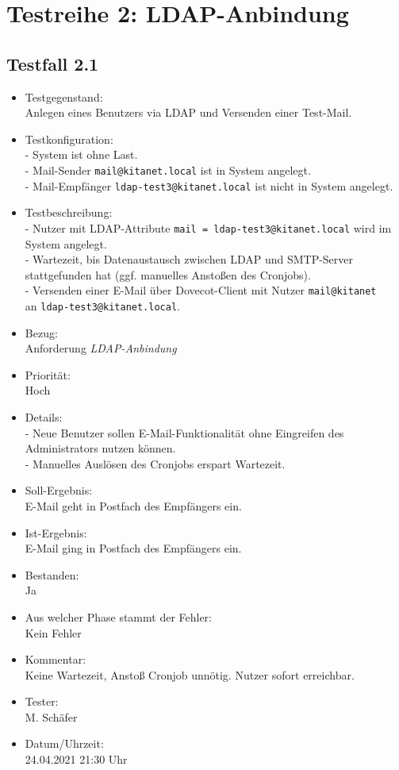 \section{Testreihe 2: LDAP-Anbindung}
\subsection{Testfall 2.1}
\begin{itemize}
	\item Testgegenstand:\\
	Anlegen eines Benutzers via LDAP und Versenden einer Test-Mail.
	\item Testkonfiguration:\\
	- System ist ohne Last.\\
	- Mail-Sender \verb+mail@kitanet.local+ ist in System angelegt.\\
	- Mail-Empfänger \verb+ldap-test3@kitanet.local+ ist nicht in System angelegt.
	\item Testbeschreibung:\\
	- Nutzer mit LDAP-Attribute \verb+mail = ldap-test3@kitanet.local+ wird im System angelegt.\\
	- Wartezeit, bis Datenaustausch zwischen LDAP und SMTP-Server stattgefunden hat (ggf. manuelles Anstoßen des Cronjobs).\\
	- Versenden einer E-Mail über Dovecot-Client mit Nutzer \verb+mail@kitanet+ \\ an \verb+ldap-test3@kitanet.local+.
	\item Bezug:\\
	Anforderung \textit{LDAP-Anbindung}
	\item Priorität:\\
	Hoch
	\item Details:\\
	- Neue Benutzer sollen E-Mail-Funktionalität ohne Eingreifen des Administrators nutzen können.\\
	- Manuelles Auslösen des Cronjobs erspart Wartezeit.
	\item Soll-Ergebnis:\\
	E-Mail geht in Postfach des Empfängers ein.
	\item Ist-Ergebnis:\\
	E-Mail ging in Postfach des Empfängers ein.
	\item Bestanden:\\
	Ja
	\item Aus welcher Phase stammt der Fehler:\\
	Kein Fehler	
	\item Kommentar:\\
	Keine Wartezeit, Anstoß Cronjob unnötig. Nutzer sofort erreichbar.
	\item Tester:\\
	M. Schäfer
	\item Datum/Uhrzeit:\\
	24.04.2021 21:30 Uhr
\end{itemize}

